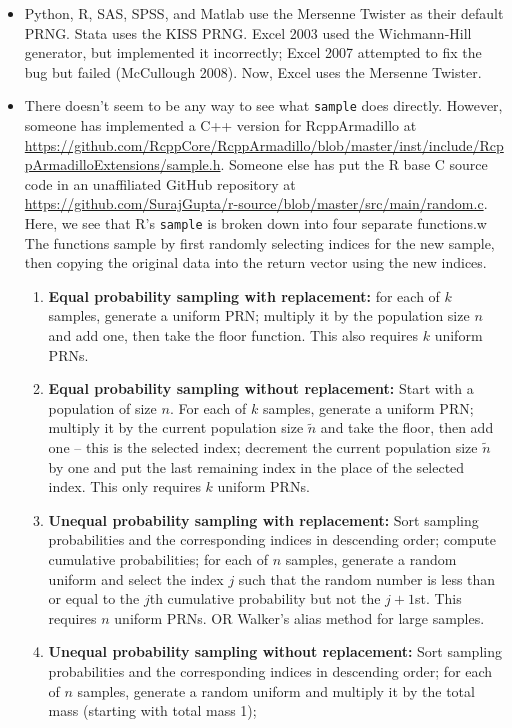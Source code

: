 \documentclass[12pt]{article}
\begin{document}
\begin{itemize}
\item Python, R, SAS, SPSS, and Matlab use the Mersenne Twister as their default PRNG.
Stata uses the KISS PRNG.
Excel 2003 used the Wichmann-Hill generator, but implemented it incorrectly; Excel 2007 attempted to fix the bug but failed (McCullough 2008).
Now, Excel uses the Mersenne Twister.
\item There doesn't seem to be any way to see what \texttt{sample} does directly.
However, someone has implemented a C++ version for RcppArmadillo at \url{https://github.com/RcppCore/RcppArmadillo/blob/master/inst/include/RcppArmadilloExtensions/sample.h}.
Someone else has put the R base C source code in an unaffiliated GitHub repository at \url{https://github.com/SurajGupta/r-source/blob/master/src/main/random.c}.
Here, we see that R's \texttt{sample} is broken down into four separate functions.w
The functions sample by first randomly selecting indices for the new sample, then copying the original data into the return vector using the new indices.
\begin{enumerate}
\item \textbf{Equal probability sampling with replacement:} 
for each of $k$ samples, generate a uniform PRN;
multiply it by the population size $n$ and add one, then take the floor function.
This also requires $k$ uniform PRNs.
\item \textbf{Equal probability sampling without replacement:} 
Start with a population of size $n$.
For each of $k$ samples, generate a uniform PRN;
multiply it by the current population size $\tilde{n}$ and take the floor, then add one -- this is the selected index;
decrement the current population size $\tilde{n}$ by one and put the last remaining index in the place of the selected index.
This only requires $k$ uniform PRNs.
\item \textbf{Unequal probability sampling with replacement:} 
Sort sampling probabilities and the corresponding indices in descending order; 
compute cumulative probabilities; 
for each of $n$ samples, generate a random uniform and select the index $j$ such that the random number is less than or equal to the $j$th cumulative probability but not the $j+1$st.  
This requires $n$ uniform PRNs.  
OR Walker's alias method for large samples.
\item \textbf{Unequal probability sampling without replacement:} 
Sort sampling probabilities and the corresponding indices in descending order; 
for each of $n$ samples, generate a random uniform and multiply it by the total mass (starting with total mass 1);

\end{enumerate}
\end{itemize}
\end{document}
